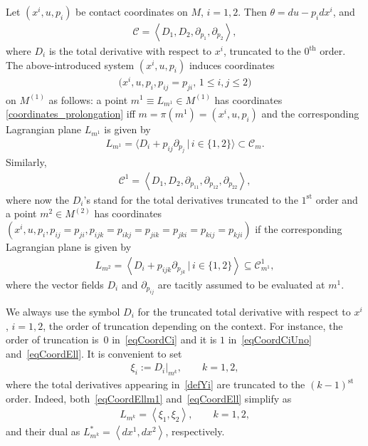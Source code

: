 \documentclass[pdftex]{sigma}
\newcommand{\C}{\mathcal{C}}
\newcommand{\CC}{\mathcal{C}^{1}}
\newcommand{\Span}[1]{\left\langle #1 \right\rangle}
\newcommand{\Th}{^\textrm{th}}
\newcommand{\St}{^\textrm{st}}
\numberwithin{equation}{section}
\begin{document}
Let $(x^i, u, p_i)$ be contact coordinates on $M$, $i=1, 2$. Then
$\theta = du - p_i dx^i$, and
\begin{gather}\label{eqCoordCi}
\C = \Span{D_1,D_2, \partial_{p_1},\partial_{p_2}},
\end{gather}
where $D_i$ is the total derivative with respect to $x^i$, truncated to the $0\Th$ order. The above-introduced system $(x^i,u,p_i)$ induces coordinates
\begin{gather}\label{coordinates_prolongation}
\big(x^i, u, p_i, p_{ij}= p_{ji} ,\, 1 \leq i, j \leq 2 \big)
\end{gather}
on $M^{(1)}$ as follows: a point $m^1 \equiv L_{m^1} \in M^{(1)}$
has coordinates \eqref{coordinates_prolongation} if\/f $m=\pi(m^1)=(x^i,u,p_i)$ and the
corresponding Lagrangian plane $L_{m^1}$ is given by
\begin{gather}\label{eqCoordEllm1}
L_{m^1}=\langle D_i + p_{ij}\partial_{p_{j}}\,| \,i\in\{1,2\}\rangle\subset\mathcal{C}_{m}.
\end{gather}
Similarly,
\begin{gather}\label{eqCoordCiUno}
\CC=\Span{D_1,D_2, \partial_{p_{11}},\partial_{p_{12}},\partial_{p_{22}}},
\end{gather}
where now the $D_i$'s stand for the total derivatives truncated to the $1\St$ order and a point $m^2\in M^{(2)}$ has coordinates $(x^i,u,p_i,p_{ij}=p_{ji},p_{ijk}=p_{ikj}=p_{jik}=p_{jki}=p_{kij}=p_{kji})$ if the corresponding Lagrangian plane is given by
\begin{gather}\label{eqCoordEll}
L_{m^2}=\Span{ D_i+ p_{ijk}\partial_{p_{jk}}\,| \,i\in\{1,2\}}\subseteq \C^1_{m^1},
\end{gather}
where the vector f\/ields $D_i$ and $\partial_{p_{ij}}$ are tacitly assumed to be evaluated at $m^1$.

\begin{Remark}\label{remcoordELLE}
We always use the symbol $D_i$ for the truncated total derivative with respect to $x^i$, $i=1,2$, the order of truncation depending on the context. For instance, the order of truncation is~$0$ in~\eqref{eqCoordCi} and it is $1$ in~\eqref{eqCoordCiUno} and~\eqref{eqCoordEll}.
It is convenient to set
 \begin{gather}\label{defYi}
\xi_i:=\left. D_i\right|_{m^k},\qquad k=1,2,
\end{gather}
where the total derivatives appearing in~\eqref{defYi} are truncated to the $(k-1)\St$ order. Indeed, both~\eqref{eqCoordEllm1}
and~\eqref{eqCoordEll} simplify as
\begin{gather}
L_{m^k}=\Span{ \xi_1,\xi_2 },\qquad k=1,2,\label{coordELLE}
\end{gather}
and their dual as
$L_{m^k}^\ast=\Span{dx^1,dx^2}$,
respectively.
\end{Remark}
\end{document}
